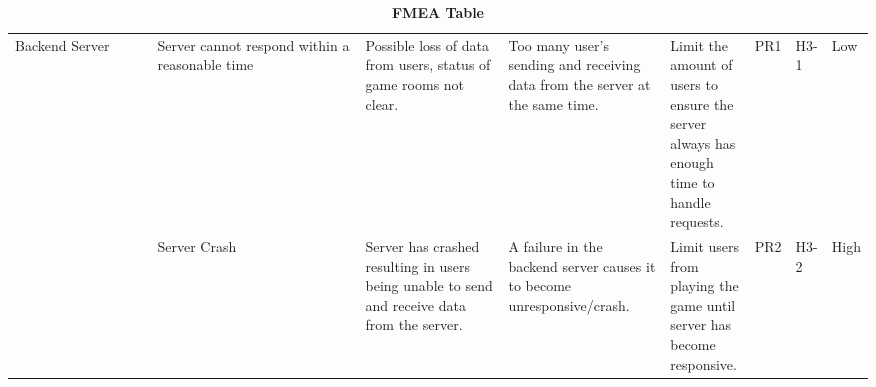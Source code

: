 \documentclass{article}
\begin{document}
\begin{table}[H]
\begin{adjustbox}{width=(/5)}
\begin{tabular}{|p{0.20\linewidth} | p{0.30\linewidth} | p{0.20\linewidth}|  p{0.20\linewidth}|  p{0.30\linewidth}|  p{0.07\linewidth}|  p{0.07\linewidth}|p{0.12\linewidth}| }
          \hline
          Backend Server                   &    Server cannot respond within a reasonable time         &     Possible loss of data from users, status of game rooms not clear.    &    Too many user's sending and receiving data from the server at the same time.    &     Limit the amount of users to ensure the server always has enough time to handle requests.      &   PR1          &  H3-1            &      Low            \\
                                   &     Server Crash                   & Server has crashed resulting in users being unable to send and receive data from the server.                          &   A failure in the backend server causes it to become unresponsive/crash.                       &  Limit users from playing the game until server has become responsive.                               &  PR2           &  H3-2             &  High                 \\
          \hline
    \end{tabular}
    \end{adjustbox}
    \caption{\bf FMEA Table}
    \label{tab:FMEA1}
\end{table}
\end{document}
